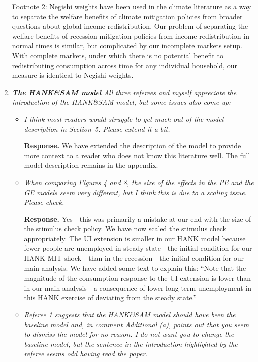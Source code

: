 \documentclass[12pt,letterpaper,english]{article}
\begin{document}
\begin{enumerate}
Footnote 2: Negishi weights have been used in the climate literature as a way to separate the welfare benefits of climate mitigation policies from broader questions about global income redistribution. Our problem of separating the welfare benefits of recession mitigation policies from income redistribution in normal times is similar, but complicated by our incomplete markets setup. With complete markets, under which there is no potential benefit to redistributing consumption across time for any individual household, our measure is identical to Negishi weights.

\item \textit{\textbf{The HANK\&SAM model} All three referees and myself appreciate the introduction of the HANK\&SAM model, but some issues also come up:}
	\begin{itemize}
		\item \textit{I think most readers would struggle to get much out of the model description in Section~5. Please extend it a bit.}
		
		\noindent \textbf{Response.} We have extended the description of the model to provide more context to a reader who does not know this literature well. The full model description remains in the appendix.
		
		\item \textit{When comparing Figures 4 and 8, the size of the effects in the PE and the GE models seem very different, but I think this is due to a scaling issue. Please check.}
		
		\noindent \textbf{Response.} Yes - this was primarily a mistake at our end with the size of the stimulus check policy. We have now scaled the stimulus check appropriately. The UI extension is smaller in our HANK model because fewer people are unemployed in steady state---the initial condition for our HANK MIT shock---than in the recession---the initial condition for our main analysis. We have added some text to explain this: ``Note that the magnitude of the consumption response to the UI extension is lower than in our main analysis---a consequence of lower long-term unemployment in this HANK exercise of deviating from the steady state.''
		
		\item \textit{Referee 1 suggests that the HANK\&SAM model should have been the baseline model and, in comment Additional (a), points out that you seem to dismiss the model for no reason. I do not want you to change the baseline model, but	the sentence in the introduction highlighted by the referee seems odd having read the paper.}
		

\end{itemize}
\end{enumerate}
\end{document}
